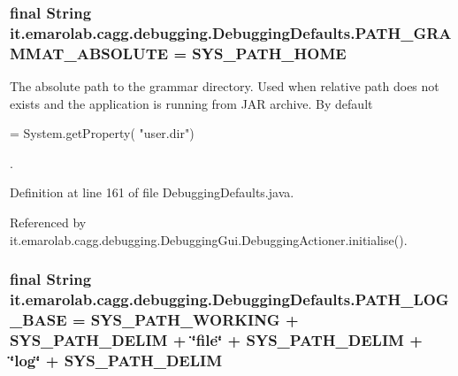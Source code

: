 \hypertarget{classit_1_1emarolab_1_1cagg_1_1debugging_1_1DebuggingDefaults_acc556622b1071cf89435b9eb07d65208}{
\subsubsection[{P\-A\-T\-H\-\_\-\-G\-R\-A\-M\-M\-A\-T\-\_\-\-A\-B\-S\-O\-L\-U\-T\-E}]{\setlength{\rightskip}{0pt plus 5cm}final String it.\-emarolab.\-cagg.\-debugging.\-Debugging\-Defaults.\-P\-A\-T\-H\-\_\-\-G\-R\-A\-M\-M\-A\-T\-\_\-\-A\-B\-S\-O\-L\-U\-T\-E = {\bf S\-Y\-S\-\_\-\-P\-A\-T\-H\-\_\-\-H\-O\-M\-E}\hspace{0.3cm}{\ttfamily [static]}}}\label{classit_1_1emarolab_1_1cagg_1_1debugging_1_1DebuggingDefaults_acc556622b1071cf89435b9eb07d65208}
The absolute path to the grammar directory. Used when relative path does not exists and the application is running from J\-A\-R archive. By default
\begin{DoxyCode}
= System.getProperty( \textcolor{stringliteral}{"user.dir"}) 
\end{DoxyCode}
 . 

Definition at line 161 of file Debugging\-Defaults.\-java.



Referenced by it.\-emarolab.\-cagg.\-debugging.\-Debugging\-Gui.\-Debugging\-Actioner.\-initialise().

\hypertarget{classit_1_1emarolab_1_1cagg_1_1debugging_1_1DebuggingDefaults_a23849ccb6a25d25160066f5fa24b8e02}{
\subsubsection[{P\-A\-T\-H\-\_\-\-L\-O\-G\-\_\-\-B\-A\-S\-E}]{\setlength{\rightskip}{0pt plus 5cm}final String it.\-emarolab.\-cagg.\-debugging.\-Debugging\-Defaults.\-P\-A\-T\-H\-\_\-\-L\-O\-G\-\_\-\-B\-A\-S\-E = {\bf S\-Y\-S\-\_\-\-P\-A\-T\-H\-\_\-\-W\-O\-R\-K\-I\-N\-G} + {\bf S\-Y\-S\-\_\-\-P\-A\-T\-H\-\_\-\-D\-E\-L\-I\-M} + \char`\"{}file\char`\"{} + S\-Y\-S\-\_\-\-P\-A\-T\-H\-\_\-\-D\-E\-L\-I\-M + \char`\"{}log\char`\"{} + S\-Y\-S\-\_\-\-P\-A\-T\-H\-\_\-\-D\-E\-L\-I\-M\hspace{0.3cm}{\ttfamily [static]}}}\label{classit_1_1emarolab_1_1cagg_1_1debugging_1_1DebuggingDefaults_a23849ccb6a25d25160066f5fa24b8e02}


